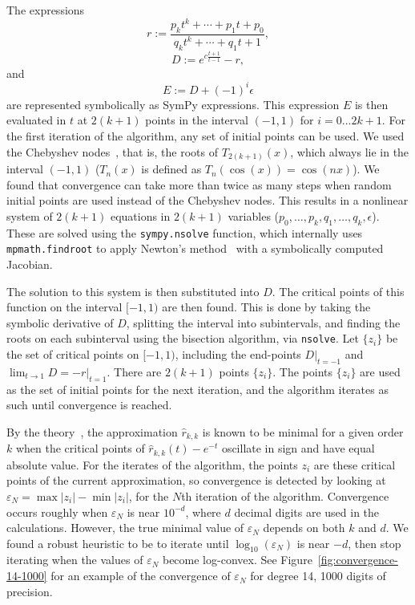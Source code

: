 The expressions
\begin{equation}
  r := \frac{p_kt^k + \cdots + p_1t + p_0}{q_kt^k + \cdots +
    q_1t + 1},
\end{equation}
\begin{equation}
  D := e^{c\frac{t+1}{t-1}} - r,
\end{equation}
and
\begin{equation}
  E := D + (-1)^i\epsilon
\end{equation}
are represented symbolically as SymPy expressions. This expression $E$ is
then evaluated in $t$ at $2(k + 1)$ points in the interval $(-1, 1)$ for
$i=0\ldots 2k+1$. For the first iteration of the algorithm, any set of initial
points can be used. We used the Chebyshev nodes~\cite{ationneeded}, that is,
the roots of $T_{2(k +1)}(x)$, which always lie in the interval $(-1, 1)$
($T_n(x)$ is defined as $T_n(\cos(x)) = \cos(nx)$). We found that convergence
can take more than twice as many steps when random initial points are used
instead of the Chebyshev nodes.  This results in a
nonlinear system of $2(k+1)$ equations in $2(k+1)$ variables
($p_0,\ldots,p_k,q_1,\ldots,q_k,\epsilon$). These are solved using the
\texttt{sympy.nsolve} function, which internally uses \texttt{mpmath.findroot}
to apply Newton's method~\cite{ationneeded} with a symbolically computed
Jacobian.

\label{sec:nsolve-bisection}
The solution to this system is then substituted into $D$. The critical points
of this function on the interval $[-1, 1)$ are then found. This is done by
taking the symbolic derivative of $D$, splitting the interval into
subintervals, and finding the roots on each subinterval using the bisection
algorithm, via \texttt{nsolve}. Let $\{z_i\}$ be the set of critical points on
$[-1, 1)$, including the end-points $D|_{t=-1}$ and
$\lim_{t\to 1} D=-r|_{t=1}$. There are $2(k+1)$ points $\{z_i\}$. The points
$\{z_i\}$ are used as the set of initial points for the next iteration, and
the algorithm iterates as such until convergence is reached.

By the theory~\cite{ationneeded}, the approximation $\hat{r}_{k, k}$ is known
to be minimal for a given order $k$ when the critical points of
$\hat{r}_{k, k}(t) - e^{-t}$ oscillate in sign and have equal absolute value.
For the iterates of the algorithm, the points $z_i$ are these critical points
of the current approximation, so convergence is detected by looking at
$\varepsilon_N = \max{|z_i|} - \min{|z_i|}$, for the $N$th iteration of the
algorithm. Convergence occurs roughly when $\varepsilon_N$ is near $10^{-d}$,
where $d$ decimal digits are used in the calculations. However, the true
minimal value of $\varepsilon_N$ depends on both $k$ and $d$. We found a
robust heuristic to be to iterate until $\log_{10}{(\varepsilon_N)}$ is near
$-d$, then stop iterating when the values of $\varepsilon_N$ become
log-convex. See Figure~\ref{fig:convergence-14-1000} for an example of the
convergence of $\varepsilon_N$ for degree 14, 1000 digits of precision.

